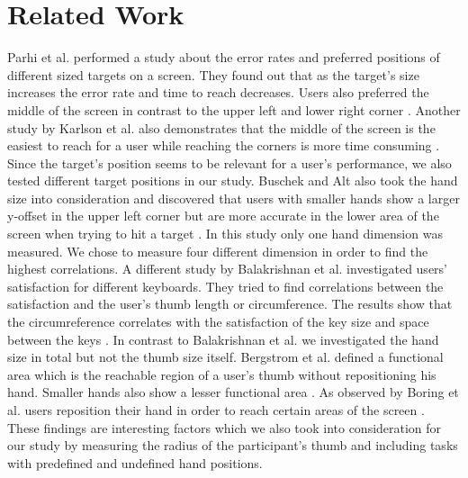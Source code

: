 \documentclass{sigchi}
\begin{document}
\section{Related Work}
Parhi et al. performed a study about the error rates and preferred positions of different sized targets on a screen. They found out that as the target's size increases the error rate and time to reach decreases. Users also preferred the middle of the screen in contrast to the upper left and lower right corner \cite{parhi2006target}. Another study by Karlson et al. also demonstrates that the middle of the screen is the easiest to reach for a user while reaching the corners is more time consuming \cite{karlson2006studies}. Since the target's position seems to be relevant for a user's performance, we also tested different target positions in our study. Buschek and Alt also took the hand size into consideration and discovered that users with smaller hands show a larger y-offset in the upper left corner but are more accurate in the lower area of the screen when trying to hit a target \cite{buschek2015touchml}. In this study only one hand dimension was measured. We chose to measure four different dimension in order to find the highest correlations. A different study by Balakrishnan et al. investigated users' satisfaction for different keyboards. They tried to find correlations between the satisfaction and the user's thumb length or circumference. The results show that the circumreference correlates with the satisfaction of the key size and space between the keys \cite{balakrishnan2008study}. In contrast to Balakrishnan et al. we investigated the hand size in total but not the thumb size itself. Bergstrom et al. defined a functional area which is the reachable region of a user's thumb without repositioning his hand. Smaller hands also show a lesser functional area \cite{bergstrom2014modeling}. As observed by Boring et al. users reposition their hand in order to reach certain areas of the screen \cite{boring2012fat}. These findings are interesting factors which we also took into consideration for our study by measuring the radius of the participant's thumb and including tasks with predefined and undefined hand positions.
\end{document}
